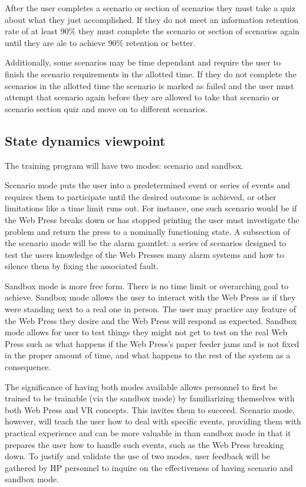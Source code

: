 \documentclass[onecolumn, draftclsnofoot,10pt, compsoc]{IEEEtran}
\begin{document}
After the user completes a scenario or section of scenarios they must take a quiz about what they just accomplished. If they do not meet an information retention rate of at least 90\% they must complete the scenario or section of scenarios again until they are ale to achieve 90\% retention or better.

Additionally, some scenarios may be time dependant and require the user to finish the scenario requirements in the allotted time. If they do not complete the scenarios in the allotted time the scenario is marked as failed and the user must attempt that scenario again before they are allowed to take that scenario or scenario section quiz and move on to different scenarios.
\subsection{State dynamics viewpoint}
The training program will have two modes: scenario and sandbox.

Scenario mode puts the user into a predetermined event or series of events and requires them to participate until the desired outcome is achieved, or other limitations like a time limit runs out. For instance, one such scenario would be if the Web Press breaks down or has stopped printing the user must investigate the problem and return the press to a nominally functioning state. A subsection of the scenario mode will be the alarm gauntlet: a series of scenarios designed to test the users knowledge of the Web Presses many alarm systems and how to silence them by fixing the associated fault.

Sandbox mode is more free form. There is no time limit or overarching goal to achieve. Sandbox mode allows the user to interact with the Web Press as if they were standing next to a real one in person. The user may practice any feature of the Web Press they desire and the Web Press will respond as expected. Sandbox mode allows for user to test things they might not get to test on the real Web Press such as what happens if the Web Press's paper feeder jams and is not fixed in the proper amount of time, and what happens to the rest of the system as a consequence.

The significance of having both modes available allows personnel to first be trained to be trainable (via the sandbox mode) by familiarizing themselves with both Web Press and VR concepts. This invites them to succeed. Scenario mode, however, will teach the user how to deal with specific events, providing them with practical experience and can be more valuable in than sandbox mode in that it prepares the user how to handle such events, such as the Web Press breaking down. To justify and validate the use of two modes, user feedback will be gathered by HP personnel to inquire on the effectiveness of having scenario and sandbox mode.
\end{document}
